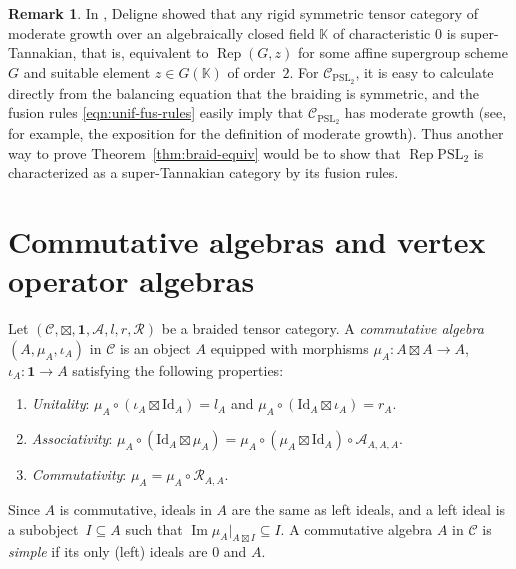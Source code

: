 \documentclass[pdftex]{sigma}
\numberwithin{equation}{section}
\theoremstyle{definition}
\newtheorem{Remark}[Theorem]{Remark}
\begin{document}
\begin{Remark}
In \cite{Del}, Deligne showed that any rigid symmetric tensor category of moderate growth over an algebraically closed field $\mathbb{K}$ of characteristic $0$ is super-Tannakian, that is, equivalent to $\operatorname{Rep}(G,z)$ for some affine supergroup scheme $G$ and suitable element $z\in G(\mathbb{K})$ of order~$2$. For $\mathcal{C}_{\mathrm{PSL}_2}$, it is easy to calculate directly
 from the balancing equation that the braiding is symmetric, and the fusion rules \eqref{eqn:unif-fus-rules} easily imply that $\mathcal{C}_{\mathrm{PSL}_2}$ has moderate growth (see, for example, the exposition \cite[Section 2.6]{EtKa} for the definition of moderate growth). Thus another way to prove Theorem~\ref{thm:braid-equiv} would be to show that $\operatorname{Rep} \mathrm{PSL}_2$ is characterized as a super-Tannakian category by its fusion rules.
\end{Remark}



\section{Commutative algebras and vertex operator algebras}\label{sec:comm-alg-and-VOA}

Let $(\mathcal{C},\boxtimes,\mathbf{1},\mathcal{A},l,r,\mathcal{R})$ be a braided tensor category. A \textit{commutative algebra} $(A,\mu_A,\iota_A)$ in $\mathcal{C}$ is an object $A$ equipped with morphisms
$
\mu_A\colon A\boxtimes A\longrightarrow A$, $\iota_A\colon \mathbf{1}\longrightarrow A$
satisfying the following properties:
\begin{enumerate}\itemsep=0pt
\item[(1)] \textit{Unitality}: $\mu_A\circ(\iota_A\boxtimes\mathrm{Id}_A)=l_A$ and $\mu_A\circ(\mathrm{Id}_A\boxtimes\iota_A)=r_A$.

\item[(2)] \textit{Associativity}: $\mu_A\circ(\mathrm{Id}_A\boxtimes\mu_A)=\mu_A\circ(\mu_A\boxtimes\mathrm{Id}_A)\circ\mathcal{A}_{A,A,A}$.

\item[(3)] \textit{Commutativity}: $\mu_A =\mu_A\circ\mathcal{R}_{A,A}$.
\end{enumerate}
Since $A$ is commutative, ideals in $A$ are the same as left ideals, and a left ideal is a subobject~${I\subseteq A}$ such that $\operatorname{Im} \mu_A\vert_{A\boxtimes I}\subseteq I$. A commutative algebra $A$ in $\mathcal{C}$ is \textit{simple} if its only (left) ideals are $0$ and $A$.
\end{document}
